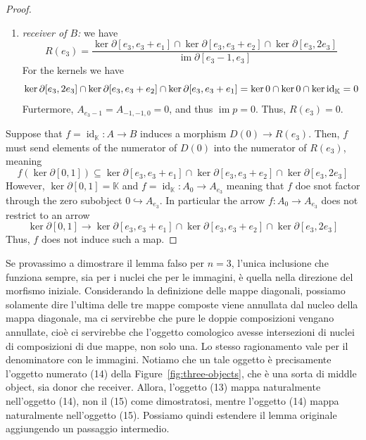 \documentclass[a4paper]{article}
\DeclareMathOperator{\im}{im}
\begin{document}
\begin{proof}
\begin{enumerate}
\[            \im \partial[-e_1, 0]
            + \im \partial[-e_2, 0]
            + \im \partial[-e_3, 0] = 0
        \]
        Thus, \(D(0) = \mathbb K\).
        \item \emph{receiver of \(B\):} we have \[
            R(e_3) = \frac{
                \ker \partial[e_3,e_3 + e_1]
                \cap \ker \partial[e_3,e_3 + e_2]
                \cap \ker \partial[e_3,2e_3]
            }{
                \im \partial[e_3-1, e_3]
            }
        \]
        For the kernels we have \[
            \ker \partial[e_3,2e_3]
            \cap \ker \partial[e_3,e_3 + e_2]
            \cap \ker \partial[e_3,e_3 + e_1]
            = \ker 0 \cap \ker 0 \cap \ker \operatorname{id}_{\mathbb K} = 0
        \]
        Furtermore, \(A_{e_3 - 1} = A_{-1, -1, 0} = 0\), and thus \(\im p = 0\).
        Thus, \(R(e_3)=0\).
    \end{enumerate}
    Suppose that \(f = \operatorname{id}_{\mathbb K} \colon A \to B\) 
    induces a morphism \(D(0) \to R(e_3)\).
    Then, \(f\) must send elements of the numerator of \(D(0)\) into the numerator of \(R(e_3)\), meaning
    \[
        f(\ker \partial[0,1]) \subseteq \ker \partial[e_3,e_3 + e_1]
        \cap \ker \partial[e_3,e_3 + e_2]
        \cap \ker \partial[e_3,2e_3]
    \]
    However, \(\ker \partial[0,1] = \mathbb K\)
    and \(f = \operatorname{id}_{\mathbb K} \colon A_0 \to A_{e_3}\)
    meaning that \(f\) doe snot factor through the zero subobject \(0 \hookrightarrow A_{e_3}\).
    In particular the arrow \(f \colon A_0 \to A_{e_3}\) does not restrict to an arrow
    \[
        \ker \partial[0,1] \to \ker \partial[e_3,e_3 + e_1]
        \cap \ker \partial[e_3,e_3 + e_2]
        \cap \ker \partial[e_3,2e_3]
    \]
    Thus, \(f\) does not induce such a map.
\end{proof}

Se provassimo a dimostrare il lemma falso per \(n=3\),
l'unica inclusione che funziona sempre, sia per i nuclei che per le immagini,
è quella nella direzione del morfismo iniziale.
Considerando la definizione delle mappe diagonali, possiamo solamente
dire l'ultima delle tre mappe composte viene
annullata dal nucleo della mappa diagonale, ma ci servirebbe
che pure le doppie composizioni vengano annullate, cioè ci servirebbe
che l'oggetto comologico avesse intersezioni di nuclei di composizioni di due mappe,
non solo una. Lo stesso ragionamento vale per il denominatore con le immagini.
Notiamo che un tale oggetto è precisamente l'oggetto numerato (14) della Figure~\ref{fig:three-objects},
che è una sorta di middle object, sia donor che receiver.
Allora, l'oggetto (13) mappa naturalmente nell'oggetto (14), non
il (15) come dimostratosi, mentre l'oggetto (14) mappa naturalmente
nell'oggetto (15). Possiamo quindi estendere il lemma originale aggiungendo un passaggio intermedio.
\end{document}
